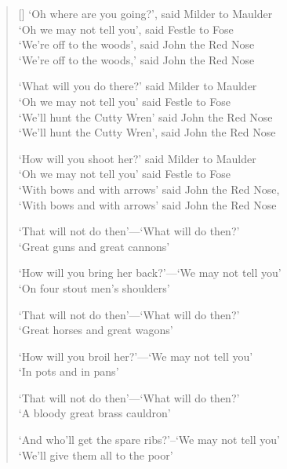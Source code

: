 \pagebreak
\settowidth{\versewidth}{And what is worse for my mother still, I'm the largest of them all.}

\begin{verse}[\versewidth]
`Oh where are you going?', said Milder to Maulder\\
`Oh we may not tell you', said Festle to Fose\\
`We're off to the woods', said John the Red Nose\\
`We're off to the woods,' said John the Red Nose

`What will you do there?' said Milder to Maulder\\
`Oh we may not tell you' said Festle to Fose\\
`We'll hunt the Cutty Wren' said John the Red Nose\\
`We'll hunt the Cutty Wren', said John the Red Nose

`How will you shoot her?' said Milder to Maulder\\
`Oh we may not tell you' said Festle to Fose\\
`With bows and with arrows' said John the Red Nose,\\
`With bows and with arrows' said John the Red Nose

`That will not do then'---`What will do then?'\\
`Great guns and great cannons'

`How will you bring her back?'---`We may not tell you'\\
`On four stout men's shoulders'

`That will not do then'---`What will do then?'\\
`Great horses and great wagons'

`How will you broil her?'---`We may not tell you'\\
`In pots and in pans'

`That will not do then'---`What will do then?'\\
 `A bloody great brass cauldron'

 `And who'll get the spare ribs?'--`We may not tell you'\\
`We'll give them all to the poor'
\end{verse}
